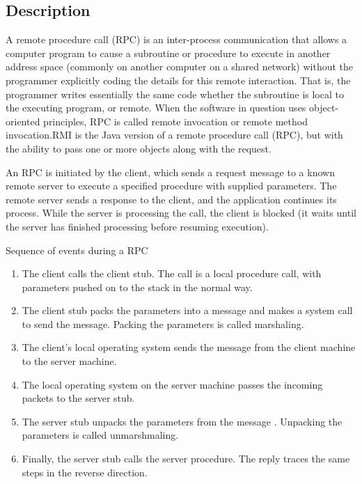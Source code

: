 \subsection{Description}
A remote procedure call (RPC) is an inter-process communication that allows a computer program to cause a subroutine or procedure to execute in another address space (commonly on another computer on a shared network) without the programmer explicitly coding the details for this remote interaction. That is, the programmer writes essentially the same code whether the subroutine is local to the executing program, or remote. When the software in question uses object-oriented principles, RPC is called remote invocation or remote method invocation.RMI is the Java version of  a remote procedure call (RPC), but with the ability to pass one or more objects along with the request. 

An RPC is initiated by the client, which sends a request message to a known remote server to execute a specified procedure with supplied parameters. The remote server sends a response to the client, and the application continues its process. While the server is processing the call, the client is blocked (it waits until the server has finished processing before resuming execution).

Sequence of events during a RPC
\begin{enumerate}
\item The client calls the client stub. The call is a local procedure call, with parameters pushed on to the stack in the normal way.
\item The client stub packs the parameters into a message and makes a system call to send the message. Packing the parameters is called marshaling.
\item The client's local operating system sends the message from the client machine to the server machine.
\item The local operating system on the server machine passes the incoming packets to the server stub.
\item The server stub unpacks the parameters from the message . Unpacking the parameters is called unmarshmaling.
\item Finally, the server stub calls the server procedure. The reply traces the same steps in the reverse direction.
\end{enumerate}


